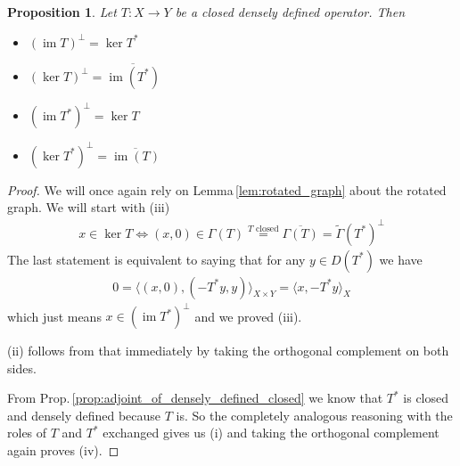 \documentclass[12pt,a4paper]{article}
\numberwithin{equation}{subsection}
\numberwithin{lemma}{subsection}
\newtheorem{proposition}[lemma]{Proposition}
\theoremstyle{definition}
\DeclareMathOperator{\Ima}{im}
\begin{document}
\begin{proposition}\label{prop:kernel_image_adjoint}
    Let $T: X \rightarrow Y$ be a closed densely defined operator. Then
    \begin{itemize}
        \item $(\Ima T)^\perp = \ker T^*$
        \item $(\ker T)^\perp = \overline{\Ima(T^*)}$
        \item $(\Ima T^*)^\perp = \ker T$
        \item $(\ker T^*)^\perp = \overline{\Ima(T)}$
    \end{itemize}
\end{proposition}
\begin{proof}
    We will once again rely on Lemma\,\ref{lem:rotated_graph} about the 
    rotated graph. We will start with (iii)
    \begin{align*}
        x \in \ker T \Leftrightarrow (x,0) \in \Gamma(T) 
        \stackrel{\text{$T$ closed}}{=} \overline{\Gamma(T)} 
        = \tilde{\Gamma}(T^*)^\perp 
    \end{align*}
    The last statement is equivalent to saying that for any $y \in D(T^*)$ 
    we have 
    \begin{align*}
        0 = \langle (x,0), (-T^*y,y) \rangle_{X \times Y}
        = \langle x, -T^*y \rangle_X
    \end{align*}
    which just means $x \in (\Ima T^*)^\perp$ and we proved (iii).

    (ii) follows from that immediately by taking the orthogonal complement 
    on both sides.

    From Prop.\,\ref{prop:adjoint_of_densely_defined_closed} 
    we know that $T^*$ is closed and densely defined because $T$
    is. So the completely analogous reasoning with the roles of $T$ and $T^*$
    exchanged gives us (i) and taking the orthogonal complement again 
    proves (iv).
\end{proof}
\end{document}
